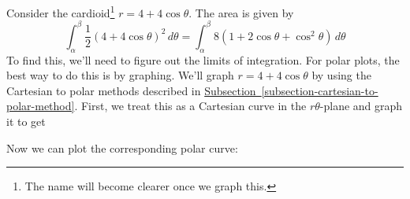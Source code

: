 \documentclass[10pt,]{book}
\theoremstyle{ptxplainnotitle}
\theoremstyle{ptxplaintitle}
\theoremstyle{ptxplainnotitle}
\theoremstyle{ptxplaintitle}
\theoremstyle{ptxplainnotitle}
\theoremstyle{ptxplaintitle}
\theoremstyle{ptxdefinitionnotitle}
\theoremstyle{ptxdefinitiontitle}
\theoremstyle{ptxdefinitionnotitle}
\theoremstyle{ptxdefinitiontitle}
\theoremstyle{ptxdefinitionnotitle}
\theoremstyle{ptxdefinitiontitle}
\theoremstyle{ptxdefinitionnotitle}
\theoremstyle{ptxdefinitiontitle}
\theoremstyle{ptxdefinitionnotitle}
\theoremstyle{ptxdefinitiontitle}
\numberwithin{equation}{section}
\begin{document}
\begin{example}\label{example-area-bounded-by-a-cardioid}
\hypertarget{p-705}{}%
Consider the cardioid\footnote{The name will become clearer once we graph this.\label{fn-1}} \(r = 4+4\cos\theta\). The area is given by%
%
\begin{equation*}
\int_{\alpha}^{\beta}\frac{1}{2}(4+4\cos\theta)^{2}\,d\theta = \int_{\alpha}^{\beta}8(1+2\cos\theta+\cos^{2}\theta)\,d\theta
\end{equation*}
\hypertarget{p-706}{}%
To find this, we'll need to figure out the limits of integration. For polar plots, the best way to do this is by graphing. We'll graph \(r=4+4\cos\theta\) by using the Cartesian to polar methods described in \hyperref[subsection-cartesian-to-polar-method]{Subsection~\ref{subsection-cartesian-to-polar-method}}. First, we treat this as a Cartesian curve in the \(r\theta\)-plane and graph it to get%
\begin{figure}
\centering
{
}
\end{figure}
\hypertarget{p-707}{}%
Now we can plot the corresponding polar curve:%
\begin{figure}
\centering
{
}
\end{figure}
\end{example}
\end{document}
